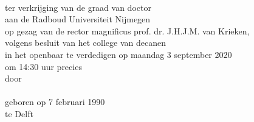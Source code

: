 \newpage

\thispagestyle{empty}
\vspace*{4em}
\begin{center}
\huge{}
\normalsize

{\Large\scshape{}}\\[2.5em]


ter verkrijging van de graad van doctor\\
aan de Radboud Universiteit Nijmegen\\
op gezag van de rector magnificus prof. dr. J.H.J.M. van Krieken,\\
volgens besluit van het college van decanen\\
in het openbaar te verdedigen op maandag 3 september 2020\\
om 14:30 uur precies\\[1.5em]

door\\[1.5em]

{\Large\scshape{}}\\[1.5em]

geboren op 7 februari 1990\\
te Delft
\end{center}
\newpage
\thispagestyle{empty}

\noindent


